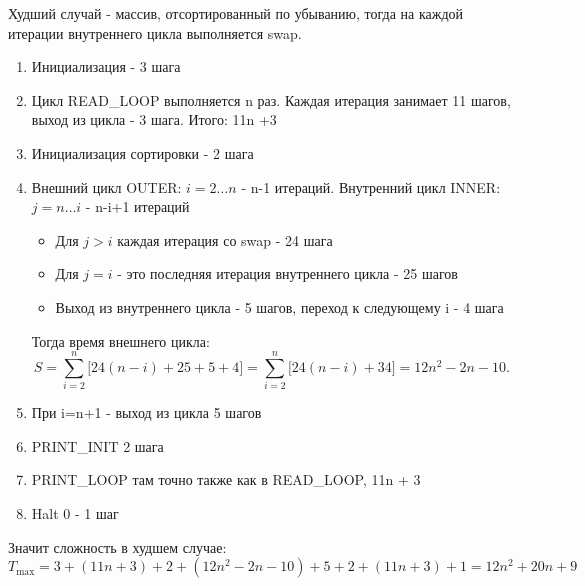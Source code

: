 \documentclass[12pt]{article}
\begin{document}
Худший случай - массив, отсортированный по убыванию, тогда на каждой итерации внутреннего цикла выполняется swap.

\begin{enumerate}
    \item Инициализация - 3 шага
    \item Цикл READ\_LOOP выполняется n раз. Каждая итерация занимает 11 шагов, выход из цикла - 3 шага. Итого: 11n +3
    \item Инициализация сортировки - 2 шага
    \item Внешний цикл OUTER: $i = 2 \dots n$ - n-1 итераций. Внутренний цикл INNER: $j = n \dots i$ - n-i+1 итераций
    \begin{itemize}
        \item Для \(j > i\) каждая итерация со swap - 24 шага
        \item Для \(j = i\) - это последняя итерация внутреннего цикла - 25 шагов
        \item Выход из внутреннего цикла - 5 шагов, переход к следующему i - 4 шага
    \end{itemize}
    Тогда время внешнего цикла:
    \[
        S = \sum_{i=2}^{n} \bigl[24(n-i) + 25 + 5 + 4\bigr] = \sum_{i=2}^{n} \bigl[24(n-i) + 34\bigr] = 12n^2 - 2n - 10.
    \]
    \item При i=n+1 - выход из цикла 5 шагов
    \item PRINT\_INIT 2 шага
    \item PRINT\_LOOP там точно также как в READ\_LOOP, 11n + 3
    \item Halt 0 - 1 шаг
\end{enumerate}

Значит сложность в худшем случае:
\[
    T_{\max} = 3 + (11n + 3) + 2 + (12n^2 - 2n - 10) + 5 + 2 + (11n + 3) + 1 = 12n^2 + 20n + 9
\]
\end{document}
